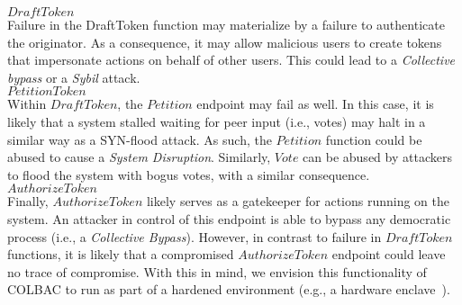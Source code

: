 \noindent$DraftToken$\mbox{}\\
Failure in the DraftToken function may materialize by a failure to authenticate
the originator. As a consequence, it may allow malicious users to create tokens
that impersonate actions on behalf of other users. This could lead to a
\emph{Collective bypass} or a \emph{Sybil} attack.\\

\noindent$PetitionToken$\mbox{}\\
Within $DraftToken$, the $Petition$ endpoint may fail as well. In this case, it
is likely that a system stalled waiting for peer input (i.e., votes) may halt
in a similar way as a SYN-flood attack. As such, the $Petition$ function could
be abused to cause a \emph{System Disruption}. Similarly, $Vote$ can be abused
by attackers to flood the system with bogus votes, with a similar consequence.\\

\noindent$AuthorizeToken$\mbox{}\\
Finally, $AuthorizeToken$ likely serves as a gatekeeper for actions running on
the system. An attacker in control of this endpoint is able to bypass any
democratic process (i.e., a \emph{Collective Bypass}). However, in contrast to
failure in $DraftToken$ functions, it is likely that a compromised
$AuthorizeToken$ endpoint could leave no trace of compromise. With this in
mind, we envision this functionality of COLBAC to run as part of a hardened
environment (e.g., a hardware enclave~\cite{sgx}).
